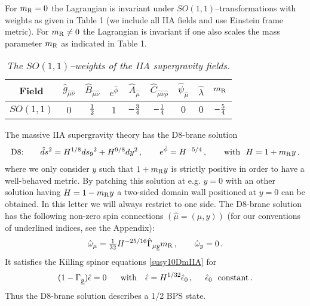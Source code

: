 \documentclass[12pt,a4paper]{article}
\begin{document}
For $m_{\rm R}=0$ the Lagrangian is invariant under
$SO(1,1)$--transformations with weights as given in Table 1 (we
include all IIA fields and use Einstein frame metric). For $m_{\rm
R} \neq 0$ the Lagrangian is invariant if one also scales the mass
parameter $m_{\rm R}$ as indicated in Table 1.


\begin{table}[h]
\begin{center}
\begin{tabular}{||c|c|c|c|c|c|c|c|c||}
\hline \rule[-1mm]{0mm}{6mm}
Field       & $\hat{g}_{\hat\mu\hat\nu}$    & $\hat{B}_{\hat\mu\hat\nu}$ &
$e^{\hat{\phi}}$ & $\hat A_{\hat\mu}$ &
$\hat{C}_{\hat\mu\hat\nu\hat\rho}$ & $\hat{\psi}_{\hat\mu}$ & $\hat{\lambda}$ & $m_{\rm R}$   \\
\hline \hline \rule[-1mm]{0mm}{6mm}
$SO(1,1)$      & 0   &
${\textstyle{{1\over 2}}}$  &
1  &
$-{\textstyle{{3\over 4}}}$   &
$-{\textstyle{{1\over 4}}}$   &
$0$   &
$0$   &
$-{\textstyle{{5\over 4}}}$   \\
\hline
\end{tabular}
\caption{\it The $SO(1,1)$--weights of the IIA supergravity fields.}
\end{center}
\end{table}



The massive IIA supergravity theory has the D8-brane solution
\cite{Polchinski:1996df,Bergshoeff:1996ui}
\begin{align}
  \text{D8:~~~~~~}
  \hat{d}s^2  = H^{1/8} ds_9{}^2 + H^{9/8} dy^2 \,, \qquad
  e^{\hat{\phi}}  = H^{-5/4} \,, \qquad
  \text{with~~} H = 1+m_{\rm R} y\, .
\label{D8}
\end{align}
where we only consider $y$ such that $1+m_{\rm R} y$ is strictly positive
in order to have a well-behaved metric. By patching this solution at e.g. $y=0$
with an other solution having $H = 1-m_{\rm R} y$ a two-sided domain wall
positioned at $y=0$
can be obtained. In this letter we will always restrict to one side.
The D8-brane solution has the following non-zero spin connections
$(\hat{\mu} = (\mu,y))$ (for our conventions of underlined indices, see the
Appendix):
\begin{equation}
  \hat{\omega}_\mu =\tfrac{1}{32} H^{-25/16} \hat{\Gamma}_{\mu \underline{y}} m_{\rm R} \,, \qquad
  \hat{\omega}_y =0\, .
\end{equation}
It satisfies the Killing spinor equations \eqref{susy10DmIIA} for
\begin{align}
  (1-\Gamma_{\underline{y}}) \hat{\epsilon} = 0 \text{~~~~ with ~~}
  \hat{\epsilon} = H^{1/32} \hat{\epsilon}_0 \,,\hskip .5truecm
\hat{\epsilon}_0\ \ {\rm constant}\, .
\end{align}
Thus the D8-brane solution describes a 1/2 BPS state.
\end{document}
